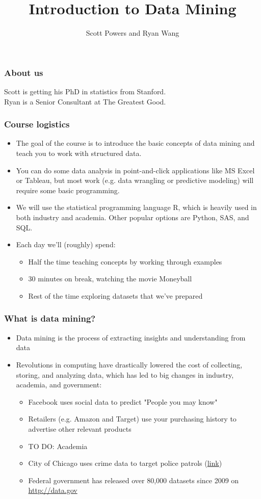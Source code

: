 \documentclass{beamer}
\title{Introduction to Data Mining}
\author{Scott Powers and Ryan Wang}
\begin{document}
\begin{frame}
\titlepage
\end{frame}

\begin{frame}
\frametitle{About us}
\begin{multicols}{2}
Scott is getting his PhD in statistics from Stanford. \\
\columnbreak
Ryan is a Senior Consultant at The Greatest Good.
\end{multicols}
\end{frame}

\begin{frame}
\frametitle{Course logistics}
\begin{itemize}
	\item The goal of the course is to introduce the basic concepts of data mining and teach you to work with structured data.
	\item You can do some data analysis in point-and-click applications like MS Excel or Tableau, but most work (e.g. data wrangling or predictive modeling) will require some basic programming.
	\item We will use the statistical programming language R, which is heavily used in both industry and academia. Other popular options are Python, SAS, and SQL.
	\item Each day we'll (roughly) spend:
	\begin{itemize}
		\item Half the time teaching concepts by working through examples
		\item 30 minutes on break, watching the movie Moneyball
		\item Rest of the time exploring datasets that we've prepared
	\end{itemize}
\end{itemize}
\end{frame}

\begin{frame}
\frametitle{What is data mining?}
\begin{itemize}
	\item Data mining is the process of extracting insights and understanding from data
	\item Revolutions in computing have drastically lowered the cost of collecting, storing, and analyzing data, which has led to big changes in industry, academia, and government:
	\begin{itemize}
		\item Facebook uses social data to predict "People you may know"
		\item Retailers (e.g. Amazon and Target) use your purchasing history to advertise other relevant products
		\item TO DO: Academia
		\item City of Chicago uses crime data to target police patrols (\href{http://dssg.io/projects/}{link})
		\item Federal government has released over 80,000 datasets since 2009 on \url{http://data.gov}
	\end{itemize}
\end{itemize}
\end{frame}
\end{document}
